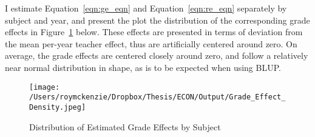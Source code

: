 \documentclass[../thesis_main.tex]{subfiles}
\begin{document}
I estimate Equation~\ref{eqn:ge_eqn} and Equation~\ref{eqn:re_eqn} separately by subject and year, and present the plot the distribution of the corresponding grade effects in Figure~\ref{fig:ge_dist} below. These effects are presented in terms of deviation from the mean per-year teacher effect, thus are artificially centered around zero. On average, the grade effects are centered closely around zero, and follow a relatively near normal distribution in shape, as is to be expected when using BLUP. 

\begin{figure}[H]
	\centering
	\texttt{[image: /Users/roymckenzie/Dropbox/Thesis/ECON/Output/Grade\_Effect\_Density.jpeg]}
	\caption{Distribution of Estimated Grade Effects by Subject}
	\label{fig:ge_dist}
\end{figure}
\end{document}
